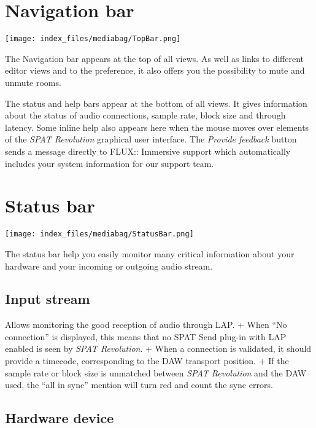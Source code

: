 \documentclass[
  letterpaper,
  DIV=11,
  numbers=noendperiod]{scrreport}
\begin{document}
\hypertarget{navigation-bar}{%
\section{Navigation bar}\label{navigation-bar}}

\texttt{[image: index\_files/mediabag/TopBar.png]}

The Navigation bar appears at the top of all views. As well as links to
different editor views and to the preference, it also offers you the
possibility to mute and unmute rooms.

The status and help bars appear at the bottom of all views. It gives
information about the status of audio connections, sample rate, block
size and through latency. Some inline help also appears here when the
mouse moves over elements of the \emph{SPAT Revolution} graphical user
interface. The \emph{Provide feedback} button sends a message directly
to FLUX:: Immersive support which automatically includes your system
information for our support team.

\hypertarget{status-bar}{%
\section{Status bar}\label{status-bar}}

\texttt{[image: index\_files/mediabag/StatusBar.png]}

The status bar help you easily monitor many critical information about
your hardware and your incoming or outgoing audio stream.

\hypertarget{input-stream}{%
\subsection{Input stream}\label{input-stream}}

Allows monitoring the good reception of audio through LAP. + When ``No
connection'' is displayed, this means that no SPAT Send plug-in with LAP
enabled is seen by \emph{SPAT Revolution}. + When a connection is
validated, it should provide a timecode, corresponding to the DAW
transport position. + If the sample rate or block size is unmatched
between \emph{SPAT Revolution} and the DAW used, the ``all in sync''
mention will turn red and count the sync errors.

\hypertarget{hardware-device}{%
\subsection{Hardware device}\label{hardware-device}}
\end{document}
